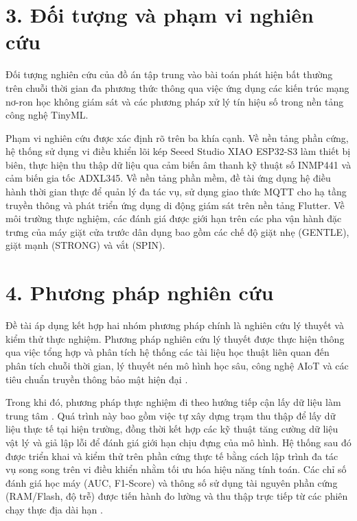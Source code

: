 \section*{3. Đối tượng và phạm vi nghiên cứu}
Đối tượng nghiên cứu của đồ án tập trung vào bài toán phát hiện bất thường trên chuỗi thời gian đa phương thức thông qua việc ứng dụng các kiến trúc mạng nơ-ron học không giám sát và các phương pháp xử lý tín hiệu số trong nền tảng công nghệ TinyML. 

Phạm vi nghiên cứu được xác định rõ trên ba khía cạnh. Về nền tảng phần cứng, hệ thống sử dụng vi điều khiển lõi kép Seeed Studio XIAO ESP32-S3 làm thiết bị biên, thực hiện thu thập dữ liệu qua cảm biến âm thanh kỹ thuật số INMP441 và cảm biến gia tốc ADXL345. Về nền tảng phần mềm, đề tài ứng dụng hệ điều hành thời gian thực để quản lý đa tác vụ, sử dụng giao thức MQTT cho hạ tầng truyền thông và phát triển ứng dụng di động giám sát trên nền tảng Flutter. Về môi trường thực nghiệm, các đánh giá được giới hạn trên các pha vận hành đặc trưng của máy giặt cửa trước dân dụng bao gồm các chế độ giặt nhẹ (GENTLE), giặt mạnh (STRONG) và vắt (SPIN).

\section*{4. Phương pháp nghiên cứu}
Đề tài áp dụng kết hợp hai nhóm phương pháp chính là nghiên cứu lý thuyết và kiểm thử thực nghiệm. Phương pháp nghiên cứu lý thuyết được thực hiện thông qua việc tổng hợp và phân tích hệ thống các tài liệu học thuật liên quan đến phân tích chuỗi thời gian, lý thuyết nén mô hình học sâu, công nghệ AIoT và các tiêu chuẩn truyền thông bảo mật hiện đại \cite{ref_1_1, ref_1_5, ref_1_6}.

Trong khi đó, phương pháp thực nghiệm đi theo hướng tiếp cận lấy dữ liệu làm trung tâm \cite{ref_1_8}. Quá trình này bao gồm việc tự xây dựng trạm thu thập để lấy dữ liệu thực tế tại hiện trường, đồng thời kết hợp các kỹ thuật tăng cường dữ liệu vật lý và giả lập lỗi để đánh giá giới hạn chịu đựng của mô hình. Hệ thống sau đó được triển khai và kiểm thử trên phần cứng thực tế bằng cách lập trình đa tác vụ song song trên vi điều khiển nhằm tối ưu hóa hiệu năng tính toán. Các chỉ số đánh giá học máy (AUC, F1-Score) và thông số sử dụng tài nguyên phần cứng (RAM/Flash, độ trễ) được tiến hành đo lường và thu thập trực tiếp từ các phiên chạy thực địa dài hạn \cite{ref_1_8}.

